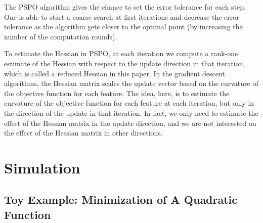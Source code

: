 \begin{remark}
The PSPO algorithm gives the chance to set the error tolerance for each step. One is able to start a coarse search at first iterations and decrease the error tolerance as the algorithm gets closer to the optimal point (by increasing the number of the computation rounds).
\end{remark}

\begin{remark}
To estimate the Hessian in PSPO, at each iteration we compute a rank-one estimate of the Hessian with respect to the update direction in that iteration, which is called a reduced Hessian in this paper. In the gradient descent algorithms, the Hessian matrix scales the update vector based on the curvature of the objective function for each feature. The idea, here, is to estimate the curvature of the objective function for each feature at each iteration, but only in the direction of the update in  that iteration. In fact, we only need to estimate the effect of the Hessian matrix in the update direction, and we are not interested on the effect of  the Hessian matrix in other directions. 
\end{remark}




\section{Simulation} \label{sec:sims}

\subsection{Toy Example: Minimization of A Quadratic Function}

